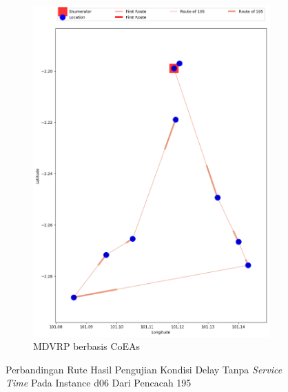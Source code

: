 \begin{figure}[H]
	\centering
	\begin{subfigure}[t]{\textwidth}
		\centering
		\includegraphics[width=\textwidth]{Resources/Images/delayed_6/real_m15_n100_delayed_6_195_coes}
		\caption{MDVRP berbasis CoEAs}
		\label{fig:real_m15_n100_delayed_6_195_coes}
	\end{subfigure}
	\caption{Perbandingan Rute Hasil Pengujian Kondisi Delay Tanpa \textit{Service Time} Pada Instance d06 Dari Pencacah 195}
	\label{fig:real_m15_n100_delayed_6_195}
\end{figure}


